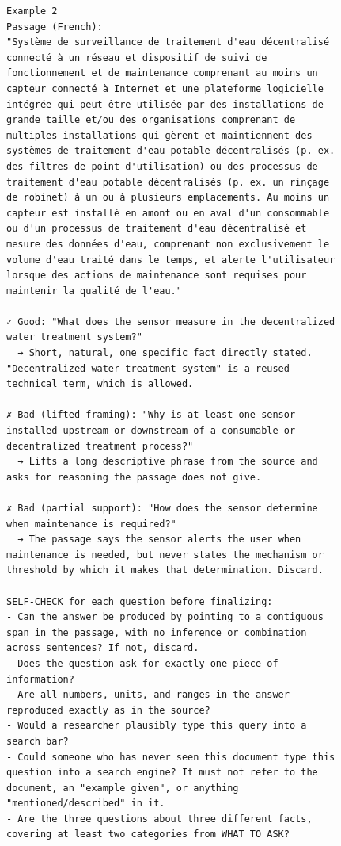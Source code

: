 \begin{figure}[h!]
\begin{minipage}{0.95\textwidth}
\begin{Verbatim}[breaklines=true, breakanywhere=true]
Example 2
Passage (French):
"Système de surveillance de traitement d'eau décentralisé connecté à un réseau et dispositif de suivi de fonctionnement et de maintenance comprenant au moins un capteur connecté à Internet et une plateforme logicielle intégrée qui peut être utilisée par des installations de grande taille et/ou des organisations comprenant de multiples installations qui gèrent et maintiennent des systèmes de traitement d'eau potable décentralisés (p. ex. des filtres de point d'utilisation) ou des processus de traitement d'eau potable décentralisés (p. ex. un rinçage de robinet) à un ou à plusieurs emplacements. Au moins un capteur est installé en amont ou en aval d'un consommable ou d'un processus de traitement d'eau décentralisé et mesure des données d'eau, comprenant non exclusivement le volume d'eau traité dans le temps, et alerte l'utilisateur lorsque des actions de maintenance sont requises pour maintenir la qualité de l'eau."

✓ Good: "What does the sensor measure in the decentralized water treatment system?"
  → Short, natural, one specific fact directly stated. "Decentralized water treatment system" is a reused technical term, which is allowed.

✗ Bad (lifted framing): "Why is at least one sensor installed upstream or downstream of a consumable or decentralized treatment process?"
  → Lifts a long descriptive phrase from the source and asks for reasoning the passage does not give.

✗ Bad (partial support): "How does the sensor determine when maintenance is required?"
  → The passage says the sensor alerts the user when maintenance is needed, but never states the mechanism or threshold by which it makes that determination. Discard.

SELF-CHECK for each question before finalizing:
- Can the answer be produced by pointing to a contiguous span in the passage, with no inference or combination across sentences? If not, discard.
- Does the question ask for exactly one piece of information?
- Are all numbers, units, and ranges in the answer reproduced exactly as in the source?
- Would a researcher plausibly type this query into a search bar?
- Could someone who has never seen this document type this question into a search engine? It must not refer to the document, an "example given", or anything "mentioned/described" in it.
- Are the three questions about three different facts, covering at least two categories from WHAT TO ASK?


\end{Verbatim}
\end{minipage}
\end{figure}
